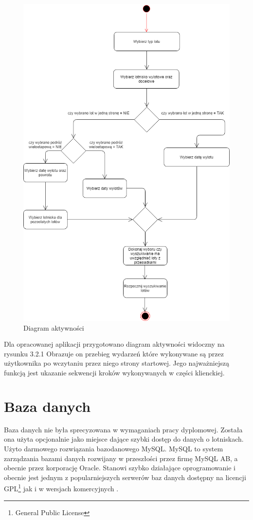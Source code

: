 \documentclass[12pt, twoside]{report}
\begin{document}
\begin{figure}[!ht]
\centering
\includegraphics[scale=0.56, keepaspectratio]{activity_diagram.png}
\caption{Diagram aktywności}
\label{fig:activity_diagram}
\end{figure}
Dla opracowanej aplikacji przygotowano diagram aktywności widoczny na rysunku 3.2.1 Obrazuje on przebieg wydarzeń które wykonywane są przez użytkownika po wczytaniu przez niego strony startowej. Jego najważniejszą funkcją jest ukazanie sekwencji kroków wykonywanych w części klienckiej.
\newpage
\section{Baza danych}
Baza danych nie była sprecyzowana w wymaganiach pracy dyplomowej. Została ona użyta opcjonalnie jako miejsce dające szybki dostęp do danych o lotniskach. Użyto darmowego rozwiązania bazodanowego MySQL. MySQL to system zarządzania bazami danych rozwijany w przeszłości przez firmę MySQL AB, a obecnie przez korporację Oracle. Stanowi szybko działające oprogramowanie i obecnie jest jednym z popularniejszych serwerów baz danych dostępny na licencji GPL\footnote{General Public License} jak i w wersjach komercyjnych \cite{mysql}.
\end{document}
